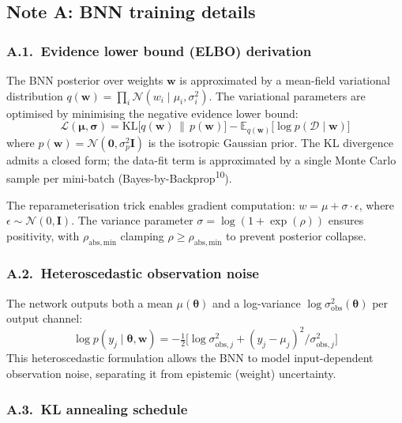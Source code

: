 \documentclass[11pt,a4paper]{article}
\begin{document}
\subsection{Note A: BNN training details}

\subsubsection*{A.1.~Evidence lower bound (ELBO) derivation}

The BNN posterior over weights $\mathbf{w}$ is approximated by a
mean-field variational distribution
$q(\mathbf{w}) = \prod_i \mathcal{N}(w_i \mid \mu_i, \sigma_i^2)$.
The variational parameters are optimised by minimising the negative
evidence lower bound:
\begin{equation}
\mathcal{L}(\boldsymbol{\mu}, \boldsymbol{\sigma})
= \mathrm{KL}\bigl[q(\mathbf{w}) \,\|\, p(\mathbf{w})\bigr]
- \mathbb{E}_{q(\mathbf{w})}\bigl[\log p(\mathcal{D} \mid \mathbf{w})\bigr]
\end{equation}
where $p(\mathbf{w}) = \mathcal{N}(\mathbf{0}, \sigma_p^2 \mathbf{I})$
is the isotropic Gaussian prior. The KL divergence admits a closed form;
the data-fit term is approximated by a single Monte Carlo sample per
mini-batch (Bayes-by-Backprop\textsuperscript{10}).

The reparameterisation trick enables gradient computation:
$w = \mu + \sigma \cdot \epsilon$, where
$\epsilon \sim \mathcal{N}(0, \mathbf{I})$. The variance parameter
$\sigma = \log(1 + \exp(\rho))$ ensures positivity, with
$\rho_\mathrm{abs,min}$ clamping $\rho \geq \rho_\mathrm{abs,min}$
to prevent posterior collapse.

\subsubsection*{A.2.~Heteroscedastic observation noise}

The network outputs both a mean $\mu(\boldsymbol{\theta})$ and a
log-variance $\log \sigma^2_\mathrm{obs}(\boldsymbol{\theta})$ per
output channel:
\begin{equation}
\log p(y_j \mid \boldsymbol{\theta}, \mathbf{w})
= -\tfrac{1}{2}\bigl[\log \sigma^2_{\mathrm{obs},j}
+ (y_j - \mu_j)^2 / \sigma^2_{\mathrm{obs},j}\bigr]
\end{equation}
This heteroscedastic formulation allows the BNN to model
input-dependent observation noise, separating it from epistemic
(weight) uncertainty.

\subsubsection*{A.3.~KL annealing schedule}
\end{document}
